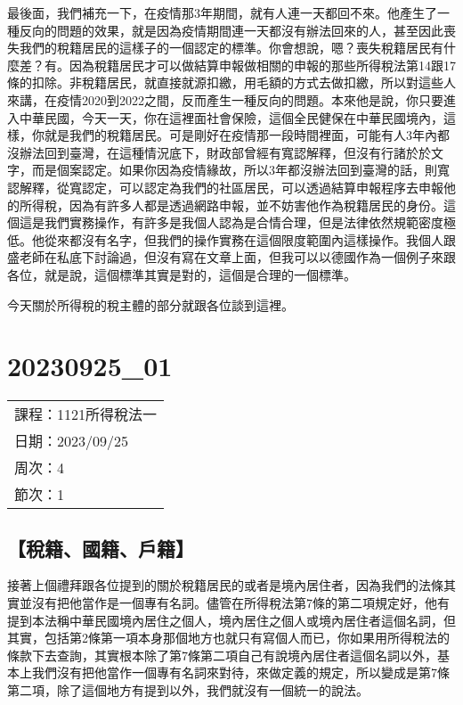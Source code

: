 \documentclass[]{ctexbook}
\begin{document}
最後面，我們補充一下，在疫情那3年期間，就有人連一天都回不來。他產生了一種反向的問題的效果，就是因為疫情期間連一天都沒有辦法回來的人，甚至因此喪失我們的稅籍居民的這樣子的一個認定的標準。你會想說，嗯？喪失稅籍居民有什麼差？有。因為稅籍居民才可以做結算申報做相關的申報的那些所得稅法第14跟17條的扣除。非稅籍居民，就直接就源扣繳，用毛額的方式去做扣繳，所以對這些人來講，在疫情2020到2022之間，反而產生一種反向的問題。本來他是說，你只要進入中華民國，今天一天，你在這裡面社會保險，這個全民健保在中華民國境內，這樣，你就是我們的稅籍居民。可是剛好在疫情那一段時間裡面，可能有人3年內都沒辦法回到臺灣，在這種情況底下，財政部曾經有寬認解釋，但沒有行諸於於文字，而是個案認定。如果你因為疫情緣故，所以3年都沒辦法回到臺灣的話，則寬認解釋，從寬認定，可以認定為我們的社區居民，可以透過結算申報程序去申報他的所得稅，因為有許多人都是透過網路申報，並不妨害他作為稅籍居民的身份。這個這是我們實務操作，有許多是我個人認為是合情合理，但是法律依然規範密度極低。他從來都沒有名字，但我們的操作實務在這個限度範圍內這樣操作。我個人跟盛老師在私底下討論過，但沒有寫在文章上面，但我可以以德國作為一個例子來跟各位，就是說，這個標準其實是對的，這個是合理的一個標準。

今天關於所得稅的稅主體的部分就跟各位談到這裡。

\hypertarget{section-7}{%
\chapter{20230925\_01}\label{section-7}}

\begin{longtable}[]{@{}l@{}}
\toprule()
\endhead
課程：1121所得稅法一 \\
日期：2023/09/25 \\
周次：4 \\
節次：1 \\
\bottomrule()
\end{longtable}

\hypertarget{ux7a05ux7c4dux570bux7c4dux6236ux7c4d}{%
\section{【稅籍、國籍、戶籍】}\label{ux7a05ux7c4dux570bux7c4dux6236ux7c4d}}

接著上個禮拜跟各位提到的關於稅籍居民的或者是境內居住者，因為我們的法條其實並沒有把他當作是一個專有名詞。儘管在所得稅法第7條的第二項規定好，他有提到本法稱中華民國境內居住之個人，境內居住之個人或境內居住者這個名詞，但其實，包括第2條第一項本身那個地方也就只有寫個人而已，你如果用所得稅法的條款下去查詢，其實根本除了第7條第二項自己有說境內居住者這個名詞以外，基本上我們沒有把他當作一個專有名詞來對待，來做定義的規定，所以變成是第7條第二項，除了這個地方有提到以外，我們就沒有一個統一的說法。
\end{document}
